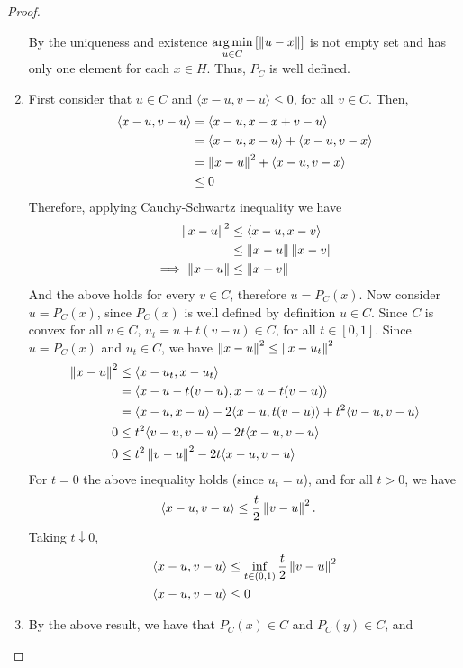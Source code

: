 \begin{lemma}
\begin{proof}
\begin{enumerate}
		By the uniqueness and existence ${\displaystyle {\underset {u\in C}{\operatorname {arg\,min} }}\left[\left\lVert u-x\right\rVert\right]}$ is not empty set and has only one element for each $x \in H$. Thus, $P_C$ is well defined.
		\item 
		First consider that $u \in C$ and $\langle x-u, v-u\rangle \leq 0$, for all $v \in C$. Then,
		\begin{align*}
			\langle x- u, v-u\rangle  & =\langle x- u, x-x+v-u\rangle \\
			& =\langle x- u, x-u\rangle+\langle x- u, v-x\rangle\\
			& =\left\lVert x- u\right\rVert^2+\langle x- u, v-x\rangle \\&\leq 0 
		\end{align*}
		Therefore, applying Cauchy-Schwartz inequality we have
		\begin{align*}
		\left\lVert x- u\right\rVert^2 &\leq \langle x- u, x-v\rangle \\
		 &\leq \left\lVert x-u\right\rVert\left\lVert x-v\right\rVert \\
		 \implies \left\lVert x- u\right\rVert&\leq \left\lVert x-v\right\rVert
		\end{align*}
		And the above holds for every $v \in C$, therefore $u = P_C(x)$. Now consider $u=P_C(x)$, since $P_C(x)$ is well defined by definition $u\in C$. 
		Since $C$ is convex for all $v \in C$, $u_t = u+t(v-u) \in C$, for all $t\in[0,1]$. Since $u=P_C(x)$ and $u_t \in C$, we have $\left\lVert x-u\right\rVert^2\leq \left\lVert x-u_t\right\rVert^2$
		\begin{align*}
			 \left\lVert x-u\right\rVert^2& \leq \langle x-u_t, x-u_t\rangle \\
			 & = \langle x-u-t(v-u),
			 x-u-t(v-u)\rangle \\
 			& = \langle x-u, x-u\rangle -2\langle x-u,
 			t(v-u)\rangle +t^2\langle v-u, v-u\rangle \\
 			0 &\leq t^2\langle v-u, v-u\rangle-2t\langle x-u, v-u\rangle\\
 			0 &\leq t^2\left\lVert v-u\right\rVert^2-2t\langle x-u, v-u\rangle
 		\end{align*}
 		For $t = 0$ the above inequality holds (since $u_t=u$), and for all $t>0$, we have 
 		\begin{align*}
	 		\langle x-u, v-u\rangle &\leq \frac{t}{2}\left\lVert v-u\right\rVert^2.
		\end{align*}
		Taking $t\downarrow 0$,
 		\begin{align*}
		 		\langle x-u, v-u\rangle &\leq \inf_{t\in(0,1)}\frac{t}{2}\left\lVert v-u\right\rVert^2 \\
		 		\langle x-u, v-u\rangle &\leq 0
		\end{align*}
		\item By the above result, we have that $P_C(x) \in C$ and $P_C(y)\in C$, and

\end{enumerate}
\end{proof}
\end{lemma}
